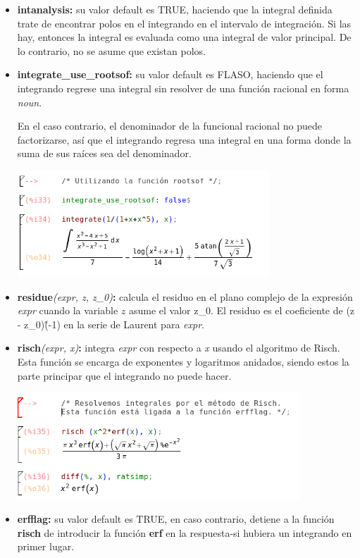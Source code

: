 \documentclass{article}
\begin{document}
\begin{itemize}
\item \textbf{intanalysis:} su valor default es TRUE, haciendo que la integral definida trate de encontrar polos en el integrando en el intervalo de integración. Si las hay, entonces la integral es evaluada como una integral de valor principal. De lo contrario, no se asume que existan polos.


\item \textbf{integrate\_use\_rootsof:} su valor default es FLASO, haciendo que el integrando regrese una integral sin resolver de una función racional en forma \textit{noun}. 

En el caso contrario, el denominador de la funcional racional no puede factorizarse, así que el integrando regresa una integral en una forma donde la suma de sus raíces sea del denominador.

	\begin{center}
    \includegraphics[height=4cm]{rootsof.png}
    \end{center}

\item\textbf{residue}\textit{(expr, z, z\_0)}\textbf{:} calcula el residuo en el plano complejo de la expresión \textit{expr} cuando la variable $z$ asume el valor z\_0. El residuo es el coeficiente de (z - z\_0)\^(-1) en la serie de Laurent para \textit{expr}.


\item\textbf{risch}\textit{(expr, x)}\textbf{:} integra \textit{expr} con respecto a \textit{x} usando el algoritmo de Risch. Esta función se encarga de exponentes y logaritmos anidados, siendo estos la parte principar que el integrando no puede hacer.

	\begin{center}
    \includegraphics[height=4cm]{risch.png}
    \end{center}

\item \textbf{erfflag:} su valor default es TRUE, en caso contrario, detiene a la función \textbf{risch} de introducir la función \textbf{erf} en la respuesta-si hubiera un integrando en primer lugar.
\end{itemize}
\end{document}
